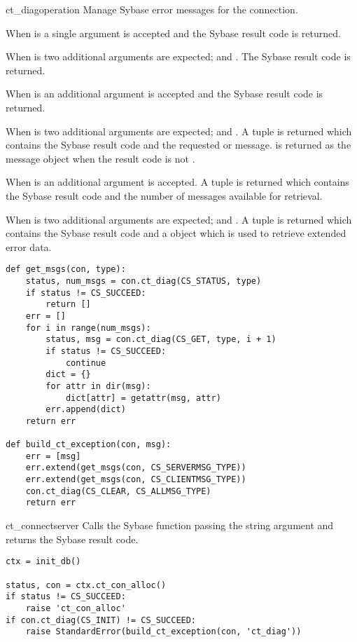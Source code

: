 \begin{methoddesc}[CS_CONNECTION]{ct_diag}{operation \optional{, \ldots}}
Manage Sybase error messages for the connection.

When  is  a single argument is accepted
and the Sybase result code is returned.

When  is  two additional arguments
are expected;  and .  The Sybase result code is
returned.

When  is  an additional 
argument is accepted and the Sybase result code is returned.

When  is  two additional arguments are
expected;  and .  A tuple is returned which
contains the Sybase result code and the requested 
or  message.   is returned as the
message object when the result code is not .

When  is  an additional 
argument is accepted.  A tuple is returned which contains the Sybase
result code and the number of messages available for retrieval.

When  is  two additional arguments are
expected;  and .  A tuple is returned which
contains the Sybase result code and a  object which
is used to retrieve extended error data.

\begin{verbatim}
def get_msgs(con, type):
    status, num_msgs = con.ct_diag(CS_STATUS, type)
    if status != CS_SUCCEED:
        return []
    err = []
    for i in range(num_msgs):
        status, msg = con.ct_diag(CS_GET, type, i + 1)
        if status != CS_SUCCEED:
            continue
        dict = {}
        for attr in dir(msg):
            dict[attr] = getattr(msg, attr)
        err.append(dict)
    return err

def build_ct_exception(con, msg):
    err = [msg]
    err.extend(get_msgs(con, CS_SERVERMSG_TYPE))
    err.extend(get_msgs(con, CS_CLIENTMSG_TYPE))
    con.ct_diag(CS_CLEAR, CS_ALLMSG_TYPE)
    return err
\end{verbatim}
\end{methoddesc}

\begin{methoddesc}[CS_CONNECTION]{ct_connect}{server}
Calls the Sybase  function passing the string
 argument and returns the Sybase result code.

\begin{verbatim}
ctx = init_db()

status, con = ctx.ct_con_alloc()
if status != CS_SUCCEED:
    raise 'ct_con_alloc'
if con.ct_diag(CS_INIT) != CS_SUCCEED:
    raise StandardError(build_ct_exception(con, 'ct_diag'))
\end{verbatim}
\end{methoddesc}

